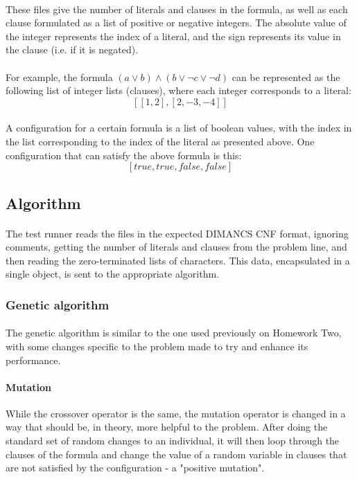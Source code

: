 \documentclass{article}
\begin{document}
\paragraph{}
These files give the number of literals and clauses in the formula, as well as each clause formulated as a list of positive or negative integers. The absolute value of the integer represents the index of a literal, and the sign represents its value in the clause (i.e. if it is negated). 
\paragraph{}
For example, the formula $(a \vee b) \wedge (b \vee \neg c \vee \neg d)$ can be represented as the following list of integer lists (clauses), where each integer corresponds to a literal: 
$$[[1, 2], [2, -3, -4]]$$

\paragraph{}
A configuration for a certain formula is a list of boolean values, with the index in the list corresponding to the index of the literal as presented above. One configuration that can satisfy the above formula is this:
$$[true, true, false, false]$$
\subsection{Algorithm}
\paragraph{}
The test runner reads the files in the expected DIMANCS CNF format, ignoring comments, getting the number of literals and clauses from the problem line, and then reading the zero-terminated lists of characters. This data, encapsulated in a single object, is sent to the appropriate algorithm. 
\subsubsection{Genetic algorithm}
\paragraph{}
The genetic algorithm is similar to the one used previously on Homework Two, with some changes specific to the problem made to try and enhance its performance. 

\paragraph{Mutation}
While the crossover operator is the same, the mutation operator is changed in a way that should be, in theory, more helpful to the problem. After doing the standard set of random changes to an individual, it will then loop through the clauses of the formula and change the value of a random variable in clauses that are not satisfied by the configuration - a "positive mutation".
\end{document}
